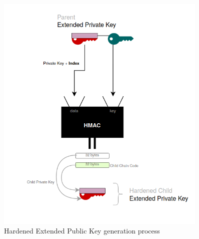\bigskip
\begin{figure}[ht!]
    \centering
    \includegraphics[width=0.9\textwidth]{images/hard_child_slip10.png}
    \caption[Hardened Extended Public Key generation process]{Hardened Extended Public Key generation process}
    \label{fig:6}
\end{figure}

